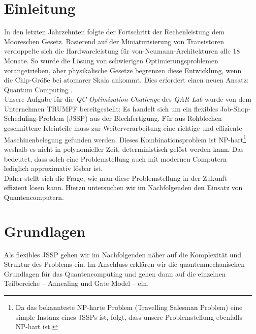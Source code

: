 \section{Einleitung}
\label{sec:intro}
In den letzten Jahrzehnten folgte der Fortschritt der Rechenleistung dem Mooreschen Gesetz. Basierend auf der Miniaturisierung von Transistoren verdoppelte sich die Hardwareleistung für von-Neumann-Architekturen alle 18 Monate. So wurde die Lösung von schwierigen Optimierungsproblemen vorangetrieben, aber physikalische Gesetze begrenzen diese Entwicklung, wenn die Chip-Größe bei atomarer Skala ankommt.
Dies erfordert einen neuen Ansatz: Quantum Computing \cite{Colwell2013}.\\
Unsere Aufgabe für die \textit{QC-Optimization-Challenge} des \textit{QAR-Lab} wurde von dem Unternehmen TRUMPF bereitgestellt:
Es handelt sich um ein flexibles Job-Shop-Scheduling-Problem (JSSP) aus der Blechfertigung. Für aus Rohblechen geschnittene Kleinteile muss zur Weiterverarbeitung eine richtige und effiziente Maschinenbelegung gefunden werden. Dieses Kombinationsproblem ist NP-hart\footnote{Da das bekannteste NP-harte Problem (Travelling Salesman Problem) eine simple Instanz eines JSSPs ist, folgt, dass unsere Problemstellung ebenfalls NP-hart ist.} weshalb es nicht in polynomieller Zeit, deterministisch  gelöst werden kann.
Das bedeutet, dass solch eine Problemstellung auch mit modernen Computern lediglich approximativ lösbar ist.\\
Daher stellt sich die Frage, wie man diese Problemstellung in der Zukunft effizient lösen kann. Hierzu untersuchen wir im Nachfolgenden den Einsatz von Quantencomputern.

\section{Grundlagen}
\label{sec:basics}
Als flexibles JSSP gehen wir im Nachfolgenden näher auf die Komplexität und Struktur des Problems ein. Im Anschluss erklären wir die quantenmechanischen Grundlagen für das Quantencomputing und gehen dann auf die einzelnen Teilbereiche -- Annealing und Gate Model -- ein.

